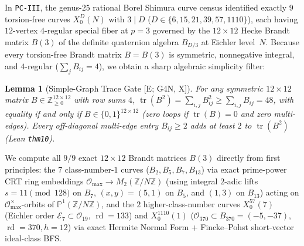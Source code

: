 \documentclass[11pt]{amsart}
\numberwithin{equation}{section}
\theoremstyle{plain}
\newtheorem{lemma}[theorem]{Lemma}
\theoremstyle{definition}\newtheorem{definition}[theorem]{Definition}
\theoremstyle{remark}\newtheorem{remark}[theorem]{Remark}
\newcommand{\Z}{\mathbb{Z}}
\newcommand{\calO}{\mathcal{O}}
\newcommand{\calE}{\mathcal{E}}
\newcommand{\ctag}[1]{\textup{\textsf{\scriptsize[#1]}}}
\begin{document}
In \texttt{PC-III}, the genus-$25$ rational Borel Shimura curve census identified exactly $9$ torsion-free curves $X_0^D(N)$ with $3\mid D$ ($D \in \{6,15,21,39,57,1110\}$), each having $12$-vertex $4$-regular special fiber at $p=3$ governed by the $12\times 12$ Hecke Brandt matrix $B(3)$ \cite{eichler1955,pizer1980,shimura1967} of the definite quaternion algebra $B_{D/3}$ at Eichler level~$N$.
Because every torsion-free Brandt matrix $B = B(3)$ is symmetric, nonnegative integral, and $4$-regular ($\sum_j B_{ij} = 4$), we obtain a sharp algebraic simplicity filter:

\begin{lemma}[Simple-Graph Trace Gate \ctag{E; G4N, X}]\label{lem:simple_trace_gate}
For any symmetric $12\times 12$ matrix $B \in \Z_{\ge 0}^{12\times 12}$ with row sums $4$, $\operatorname{tr}(B^2) = \sum_{i,j} B_{ij}^2 \ge \sum_{i,j} B_{ij} = 48$, with equality if and only if $B \in \{0,1\}^{12\times 12}$ (zero loops if $\operatorname{tr}(B)=0$ and zero multi-edges). Every off-diagonal multi-edge entry $B_{ij} \ge 2$ adds at least $2$ to $\operatorname{tr}(B^2)$ (Lean \texttt{thm10}).
\end{lemma}

We compute all $9/9$ exact $12\times 12$ Brandt matrices $B(3)$ directly from first principles: the $7$ class-number-$1$ curves ($B_2, B_5, B_7, B_{13}$) via exact prime-power CRT ring embeddings $\calO_{\max} \to M_2(\Z/N\Z)$ (using integral $2$-adic lifts $s=11\pmod{128}$ on $B_7$, $(x,y)=(5,1)$ on $B_5$, and $(1,3)$ on $B_{13}$) acting on $\calO_{\max}^\times$-orbits of $\mathbb{P}^1(\Z/N\Z)$, and the $2$ higher-class-number curves $X_0^{57}(7)$ (Eichler order $\calE_7\subset \calO_{19}$, $\operatorname{rd}=133$) and $X_0^{1110}(1)$ ($\calO_{370}\subset B_{370}=(-5,-37)$, $\operatorname{rd}=370, h=12$) via exact Hermite Normal Form + Fincke--Pohst short-vector ideal-class BFS.
\end{document}
